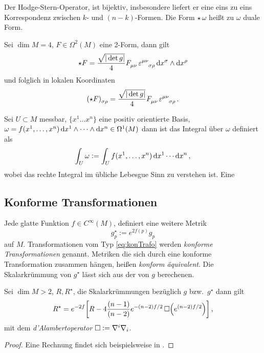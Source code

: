 Der Hodge-Stern-Operator, ist bijektiv, insbesondere liefert er eine eins zu
eins Korrespondenz zwischen $k$- und $(n-k)$-Formen. Die Form $\star\, \omega$
heißt zu $\omega$ duale Form.
 \begin{beispiel}
Sei $\dim M=4$, $F\in
\Omega^2(M)$ eine 2-Form, dann gilt
\begin{equation}
\begin{split}
\star F=
\frac{\sqrt{\vert \det g \vert}}{4}\tensor{F}{_\mu_\nu}
\tensor{\varepsilon}{^\mu^\nu_\sigma_\rho}
\dif\tensor{x}{^\sigma}\wedge\dif\tensor{x}{^\rho}
\end{split}
\end{equation}
und folglich in lokalen Koordinaten
\begin{equation}
\tensor{(\star
F)}{_\sigma_\rho}=\frac{\sqrt{\vert \det g \vert}}{4}\tensor{F}{_\mu_\nu}
\tensor{\varepsilon}{^\mu^\nu_\sigma_\rho}\,.
\end{equation}
\end{beispiel}
\begin{definition}
Sei $U\subset M$ messbar, $\{x^1\dots x^n\}$ eine positiv orientierte Basis,
$\omega=f(x^1,\dots,x^n)\dif x^1\wedge\cdots\wedge \dif x^n\in \Omega^1(M)$
dann ist das Integral über $\omega$ definiert als
\begin{equation}
\int_U \omega :=\int_U f(x^1,\dots,x^n)\dif x^1\cdots\dif x^n\,,
\end{equation}
wobei das rechte Integral im übliche Lebesgue Sinn zu verstehen ist. Eine
\end{definition}
\begin{beispiel}[Volumenform]

\end{beispiel}
\subsection{Konforme Transformationen}
Jede glatte Funktion ${f\in C^\infty (M)}$, definiert eine weitere Metrik 
\begin{equation}
g^\star_p:=e^{2f(p)}g_p\label{eq:konTrafo}
\end{equation}
auf $M$. Transformationen vom Typ \eqref{eq:konTrafo} werden \emph{konforme
Transformationen} genannt. Metriken die sich durch eine konforme
Transformation zusammen hängen, heißen \emph{konform äquivalent}. Die
Skalarkrümmung von $g^\star$ lässt sich aus der von $g$
berechenen.
\begin{lemma} Sei $\dim M>2$,
$R,R^\star$, die Skalarkrümmungen bezüglich $g$ bzw.\ $g^\star$ dann gilt
\begin{equation}
R^\star = e^{-2f}\left[R -
4\frac{(n-1)}{(n-2)}e^{-(n-2)f/2}\DAlambert\left( e^{(n-2)f/2} \right)
\right]\,,
\end{equation}
 mit dem \emph{d'Alambertoperator} $\mathop{}\!\mathbin\Box:=\nabla^{i}\nabla_i$.
\end{lemma}
\begin{proof}
Eine Rechnung findet sich beispielsweise in \cite[Kap
2.1]{capozziello2010beyond}.
\end{proof}
